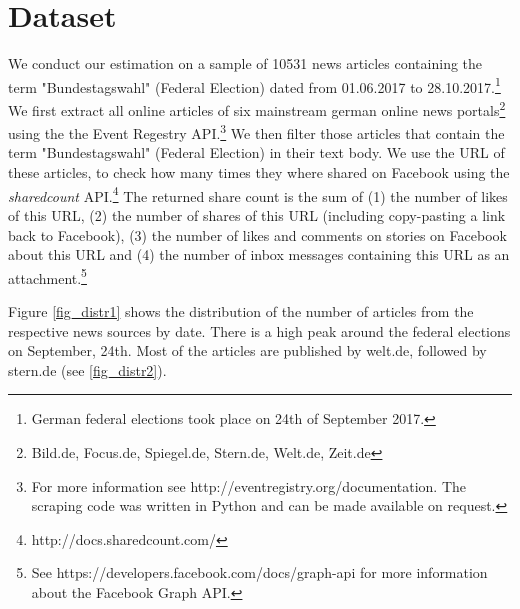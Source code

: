 \documentclass[12pt,a4paper,notitlepage]{article}
\begin{document}
\section{Dataset}\label{ch_data}

We conduct our estimation on a sample of 10531 news articles containing the term "Bundestagswahl" (Federal Election) dated from 01.06.2017 to 28.10.2017.\footnote{German federal elections took place on 24th of September 2017.} We first extract all online articles of six mainstream german online news portals\footnote{Bild.de, Focus.de, Spiegel.de, Stern.de, Welt.de, Zeit.de} using the the Event Regestry API.\footnote{For more information see http://eventregistry.org/documentation. The scraping code was written in Python and can be made available on request.} We then filter those articles that contain the term "Bundestagswahl" (Federal Election) in their text body. We use the URL of these articles, to check how many times they where shared on Facebook using the \textit{sharedcount} API.\footnote{http://docs.sharedcount.com/} The returned share count is the sum of (1) the number of likes of this URL, (2) the number of shares of this URL (including copy-pasting a link back to Facebook), (3) the number of likes and comments on stories on Facebook about this URL and (4) the number of inbox messages containing this URL as an attachment.\footnote{See https://developers.facebook.com/docs/graph-api for more information about the Facebook Graph API.}

Figure \ref{fig_distr1} shows the distribution of the number of articles from the respective news sources by date. There is a high peak around the federal elections on September, 24th. Most of the articles are published by welt.de, followed by stern.de (see \ref{fig_distr2}).  
\end{document}
